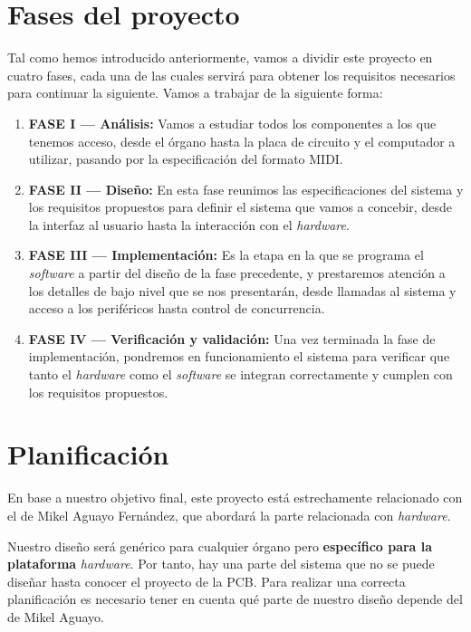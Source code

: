 \newpage

\section{Fases del proyecto}

Tal como hemos introducido anteriormente, vamos a dividir este proyecto en cuatro fases, cada una de las cuales servirá para obtener los requisitos necesarios para continuar la siguiente. Vamos a trabajar de la siguiente forma:

\begin{enumerate}
	\item \textbf{FASE I --- Análisis:} Vamos a estudiar todos los componentes a los que tenemos acceso, desde el órgano hasta la placa de circuito y el computador a utilizar, pasando por la especificación del formato \acrshort{MIDI}.
	
	\item \textbf{FASE II --- Diseño:} En esta fase reunimos las especificaciones del sistema y los requisitos propuestos para definir el sistema que vamos a concebir, desde la interfaz al usuario hasta la interacción con el \textit{hardware}.
	
	\item \textbf{FASE III --- Implementación:} Es la etapa en la que se programa el \textit{software} a partir del diseño de la fase precedente, y prestaremos atención a los detalles de bajo nivel que se nos presentarán, desde llamadas al sistema y acceso a los periféricos hasta control de concurrencia.
	
	\item \textbf{FASE IV --- Verificación y validación:} Una vez terminada la fase de implementación, pondremos en funcionamiento el sistema para verificar que tanto el \textit{hardware} como el \textit{software} se integran correctamente y cumplen con los requisitos propuestos.
	
\end{enumerate}

\section{Planificación}

En base a nuestro objetivo final, este proyecto está estrechamente relacionado con el de Mikel Aguayo Fernández, que abordará la parte relacionada con \textit{hardware}.

Nuestro diseño será genérico para cualquier órgano pero \textbf{específico para la plataforma} \textit{hardware}. Por tanto, hay una parte del sistema que no se puede diseñar hasta conocer el proyecto de la \acrshort{PCB}. Para realizar una correcta planificación es necesario tener en cuenta qué parte de nuestro diseño depende del de Mikel Aguayo.

